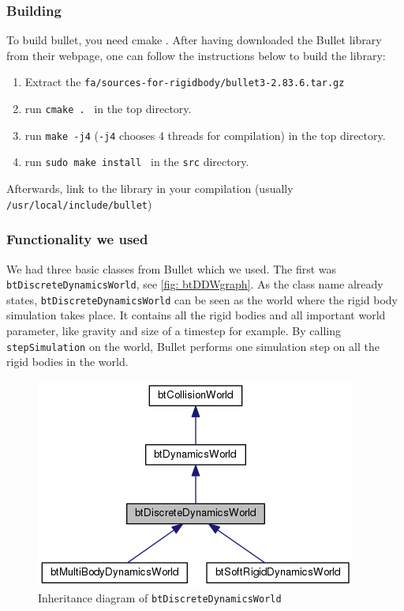 \subsubsection{Building}
To build bullet, you need cmake \cite{cmake} . After having downloaded the Bullet library from their webpage, one can follow the instructions below to build the library:
\begin{enumerate}
\item Extract the \verb+fa/sources-for-rigidbody/bullet3-2.83.6.tar.gz +
\item run \verb+cmake . + in the top directory.
\item run \verb+make -j4+ (\verb+-j4+ chooses 4 threads for compilation) in the top directory.
\item run \verb+sudo make install + in the \verb+src+ directory.
\end{enumerate}
Afterwards, link to the library in your compilation (usually \verb+/usr/local/include/bullet+)
\subsubsection{Functionality we used}
We had three basic classes from Bullet which we used. The first was \verb+btDiscreteDynamicsWorld+, see \autoref{fig: btDDWgraph}. As the class name already states, \verb+btDiscreteDynamicsWorld+ can be seen as the world where the rigid body simulation takes place. It contains all the rigid bodies and all important world parameter, like gravity and size of a timestep for example. By calling \verb+stepSimulation+ on the world, Bullet performs one simulation step on all the rigid bodies in the world.
\begin{figure}
\centering
\includegraphics[scale=0.5]{img/RigidBodies/btDiscreteDynamicsWorldGraph.png}
\caption{Inheritance diagram of \texttt{btDiscreteDynamicsWorld}}
\label{fig: btDDWgraph}
\end{figure}


